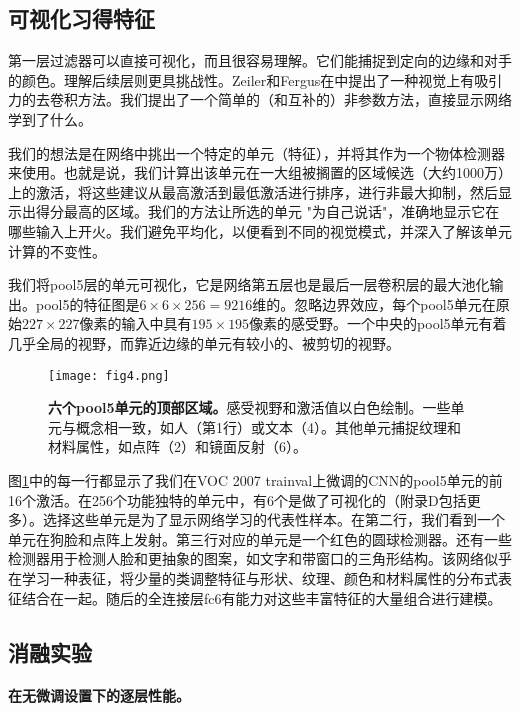 \documentclass[../main.tex]{subfile}
\begin{document}
\subsection{可视化习得特征}\label{sec:pool5_vis}

第一层过滤器可以直接可视化，而且很容易理解\cite{alexnet}。它们能捕捉到定向的边缘和对手的颜色。理解后续层则更具挑战性。Zeiler和Fergus在\cite{adaptive}中提出了一种视觉上有吸引力的去卷积方法。我们提出了一个简单的（和互补的）非参数方法，直接显示网络学到了什么。

我们的想法是在网络中挑出一个特定的单元（特征），并将其作为一个物体检测器来使用。也就是说，我们计算出该单元在一大组被搁置的区域候选（大约1000万）上的激活，将这些建议从最高激活到最低激活进行排序，进行非最大抑制，然后显示出得分最高的区域。我们的方法让所选的单元 "为自己说话"，准确地显示它在哪些输入上开火。我们避免平均化，以便看到不同的视觉模式，并深入了解该单元计算的不变性。

我们将pool5层的单元可视化，它是网络第五层也是最后一层卷积层的最大池化输出。pool5的特征图是$6\times 6\times 256 = 9216$维的。忽略边界效应，每个pool5单元在原始$227\times 227$像素的输入中具有$195\times 195$像素的感受野。一个中央的pool5单元有着几乎全局的视野，而靠近边缘的单元有较小的、被剪切的视野。

\begin{figure}[htb]
    \centering
    \texttt{[image: fig4.png]}
    \caption{\textbf{六个pool5单元的顶部区域。}感受视野和激活值以白色绘制。一些单元与概念相一致，如人（第1行）或文本（4）。其他单元捕捉纹理和材料属性，如点阵（2）和镜面反射（6）。}
    \label{fig:fig4}
\end{figure}

图\ref{fig:fig4}中的每一行都显示了我们在VOC 2007 trainval上微调的CNN的pool5单元的前16个激活。在256个功能独特的单元中，有6个是做了可视化的（附录D包括更多）。选择这些单元是为了显示网络学习的代表性样本。在第二行，我们看到一个单元在狗脸和点阵上发射。第三行对应的单元是一个红色的圆球检测器。还有一些检测器用于检测人脸和更抽象的图案，如文字和带窗口的三角形结构。该网络似乎在学习一种表征，将少量的类调整特征与形状、纹理、颜色和材料属性的分布式表征结合在一起。随后的全连接层fc6有能力对这些丰富特征的大量组合进行建模。

\subsection{消融实验} \label{sec:ablation}

\paragraph{在无微调设置下的逐层性能。}
\end{document}

